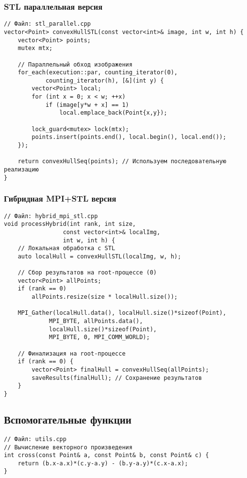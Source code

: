 \documentclass[12pt]{article}
\begin{document}
\begin{appendices}
\subsubsection{STL параллельная версия}
\begin{verbatim}
// Файл: stl_parallel.cpp
vector<Point> convexHullSTL(const vector<int>& image, int w, int h) {
    vector<Point> points;
    mutex mtx;
    
    // Параллельный обход изображения
    for_each(execution::par, counting_iterator(0), 
            counting_iterator(h), [&](int y) {
        vector<Point> local;
        for (int x = 0; x < w; ++x)
            if (image[y*w + x] == 1)
                local.emplace_back(Point{x,y});
        
        lock_guard<mutex> lock(mtx);
        points.insert(points.end(), local.begin(), local.end());
    });
    
    return convexHullSeq(points); // Используем последовательную реализацию
}
\end{verbatim}

\subsubsection{Гибридная MPI+STL версия}
\begin{verbatim}
// Файл: hybrid_mpi_stl.cpp
void processHybrid(int rank, int size, 
                 const vector<int>& localImg,
                 int w, int h) {
    // Локальная обработка с STL
    auto localHull = convexHullSTL(localImg, w, h);
    
    // Сбор результатов на root-процессе (0)
    vector<Point> allPoints;
    if (rank == 0) 
        allPoints.resize(size * localHull.size());
    
    MPI_Gather(localHull.data(), localHull.size()*sizeof(Point),
             MPI_BYTE, allPoints.data(), 
             localHull.size()*sizeof(Point),
             MPI_BYTE, 0, MPI_COMM_WORLD);
    
    // Финализация на root-процессе
    if (rank == 0) {
        vector<Point> finalHull = convexHullSeq(allPoints);
        saveResults(finalHull); // Сохранение результатов
    }
}
\end{verbatim}

\subsection{Вспомогательные функции}

\begin{verbatim}
// Файл: utils.cpp
// Вычисление векторного произведения
int cross(const Point& a, const Point& b, const Point& c) {
    return (b.x-a.x)*(c.y-a.y) - (b.y-a.y)*(c.x-a.x);
}


\end{verbatim}
\end{appendices}
\end{document}
